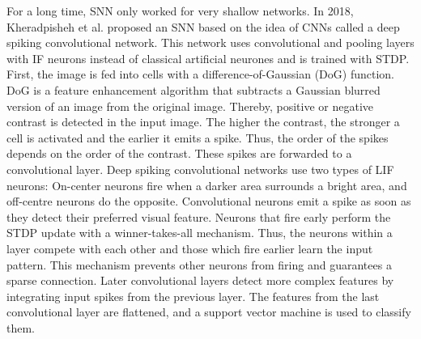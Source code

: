 For a long time, SNN only worked for very shallow networks.
In 2018, Kheradpisheh et al.  proposed an SNN based on the idea of CNNs called a deep spiking convolutional network.
This network uses convolutional and pooling layers with IF neurons instead of classical artificial neurones and is trained with STDP.
First, the image is fed into cells with a difference-of-Gaussian (DoG) function.
DoG is a feature enhancement algorithm that subtracts a Gaussian blurred version of an image from the original image.
Thereby, positive or negative contrast is detected in the input image.
The higher the contrast, the stronger a cell is activated and the earlier it emits a spike.
Thus, the order of the spikes depends on the order of the contrast.
These spikes are forwarded to a convolutional layer.
Deep spiking convolutional networks use two types of LIF neurons: On-center neurons fire when a darker area surrounds a bright area, and off-centre neurons do the opposite.
Convolutional neurons emit a spike as soon as they detect their preferred visual feature.
Neurons that fire early perform the STDP update with a winner-takes-all mechanism.
Thus, the neurons within a layer compete with each other and those which fire earlier learn the input pattern.
This mechanism prevents other neurons from firing and guarantees a sparse connection.
Later convolutional layers detect more complex features by integrating input spikes from the previous layer.
The features from the last convolutional layer are flattened, and a support vector machine is used to classify them.

